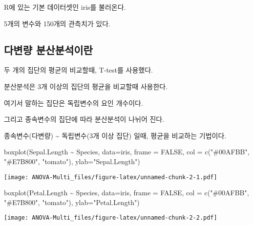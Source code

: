 \documentclass[
]{article}
\newenvironment{Shaded}{\begin{snugshade}}{\end{snugshade}}
\newcommand{\AttributeTok}[1]{\textcolor[rgb]{0.77,0.63,0.00}{#1}}
\newcommand{\ConstantTok}[1]{\textcolor[rgb]{0.00,0.00,0.00}{#1}}
\newcommand{\FunctionTok}[1]{\textcolor[rgb]{0.00,0.00,0.00}{#1}}
\newcommand{\NormalTok}[1]{#1}
\newcommand{\SpecialCharTok}[1]{\textcolor[rgb]{0.00,0.00,0.00}{#1}}
\newcommand{\StringTok}[1]{\textcolor[rgb]{0.31,0.60,0.02}{#1}}
\begin{document}
R에 있는 기본 데이터셋인 iris를 불러온다.

5개의 변수와 150개의 관측치가 있다.

\hypertarget{uxb2e4uxbcc0uxb7c9-uxbd84uxc0b0uxbd84uxc11duxc774uxb780}{%
\subsection{다변량 분산분석이란}\label{uxb2e4uxbcc0uxb7c9-uxbd84uxc0b0uxbd84uxc11duxc774uxb780}}

두 개의 집단의 평균의 비교할때, T-test를 사용했다.

분산분석은 3개 이상의 집단의 평균을 비교할때 사용한다.

여기서 말하는 집단은 독립변수의 요인 개수이다.

그리고 종속변수의 집단에 따라 분산분석이 나뉘어 진다.

종속변수(다변량) \textasciitilde{} 독립변수(3개 이상 집단) 일때, 평균을 비교하는 기법이다.

\begin{Shaded}
\begin{Highlighting}[]
\FunctionTok{boxplot}\NormalTok{(Sepal.Length }\SpecialCharTok{\textasciitilde{}}\NormalTok{ Species, }
        \AttributeTok{data=}\NormalTok{iris,}
        \AttributeTok{frame =} \ConstantTok{FALSE}\NormalTok{, }
        \AttributeTok{col =} \FunctionTok{c}\NormalTok{(}\StringTok{"\#00AFBB"}\NormalTok{, }\StringTok{"\#E7B800"}\NormalTok{, }\StringTok{"tomato"}\NormalTok{),}
        \AttributeTok{ylab=}\StringTok{"Sepal.Length"}\NormalTok{)}
\end{Highlighting}
\end{Shaded}

\texttt{[image: ANOVA-Multi\_files/figure-latex/unnamed-chunk-2-1.pdf]}

\begin{Shaded}
\begin{Highlighting}[]
\FunctionTok{boxplot}\NormalTok{(Petal.Length }\SpecialCharTok{\textasciitilde{}}\NormalTok{ Species, }
        \AttributeTok{data=}\NormalTok{iris,}
        \AttributeTok{frame =} \ConstantTok{FALSE}\NormalTok{, }
        \AttributeTok{col =} \FunctionTok{c}\NormalTok{(}\StringTok{"\#00AFBB"}\NormalTok{, }\StringTok{"\#E7B800"}\NormalTok{, }\StringTok{"tomato"}\NormalTok{),}
        \AttributeTok{ylab=}\StringTok{"Petal.Length"}\NormalTok{)}
\end{Highlighting}
\end{Shaded}

\texttt{[image: ANOVA-Multi\_files/figure-latex/unnamed-chunk-2-2.pdf]}
\end{document}
